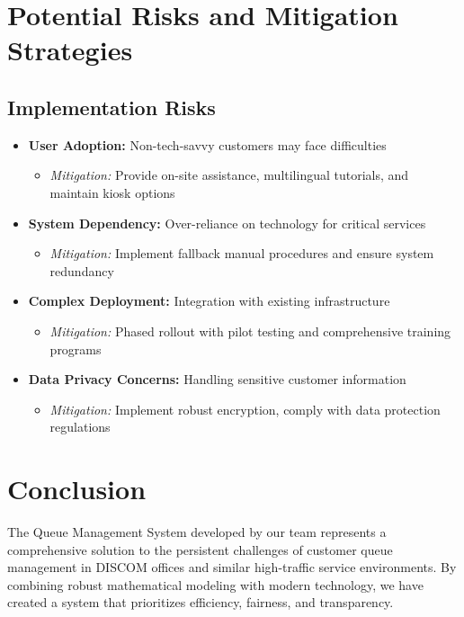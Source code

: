 \documentclass[12pt,a4paper]{report}
\begin{document}
\section{Potential Risks and Mitigation Strategies}

\subsection{Implementation Risks}
\begin{itemize}
    \item \textbf{User Adoption:} Non-tech-savvy customers may face difficulties
    \begin{itemize}
        \item \textit{Mitigation:} Provide on-site assistance, multilingual tutorials, and maintain kiosk options
    \end{itemize}
    \item \textbf{System Dependency:} Over-reliance on technology for critical services
    \begin{itemize}
        \item \textit{Mitigation:} Implement fallback manual procedures and ensure system redundancy
    \end{itemize}
    \item \textbf{Complex Deployment:} Integration with existing infrastructure
    \begin{itemize}
        \item \textit{Mitigation:} Phased rollout with pilot testing and comprehensive training programs
    \end{itemize}
    \item \textbf{Data Privacy Concerns:} Handling sensitive customer information
    \begin{itemize}
        \item \textit{Mitigation:} Implement robust encryption, comply with data protection regulations
    \end{itemize}
\end{itemize}

\section{Conclusion}

The Queue Management System developed by our team represents a comprehensive solution to the persistent challenges of customer queue management in DISCOM offices and similar high-traffic service environments. By combining robust mathematical modeling with modern technology, we have created a system that prioritizes efficiency, fairness, and transparency.
\end{document}
